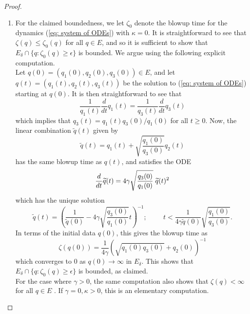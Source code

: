 \documentclass[11pt, notitlepage]{article}
\begin{document}
\begin{proof} \begin{enumerate}[label=\roman{*}).]
    \item For the claimed boundedness, we let $\zeta_0$ denote the blowup time for the dynamics (\ref{eq: system of ODEs}) with $\kappa=0$. It is straightforward to see that $\zeta(q)\le\zeta_0(q)$ for all $q\in E$, and so it is sufficient to show that $E_\delta\cap \{q: \zeta_0(q)\ge \epsilon\}$ is bounded. We argue using the following explicit computation. \medskip \\ Let $q(0)=(q_1(0),q_2(0),q_3(0))\in E$, and let $q(t)=(q_1(t),q_2(t),q_3(t))$ be the solution to (\ref{eq: system of ODEs}) starting at $q(0)$. It is then straightforward to see that \begin{equation}
        \frac{1}{q_1(t)}\frac{d}{dt}q_1(t)=\frac{1}{q_3(t)}\frac{d}{dt}q_3(t)
    \end{equation} which implies that $q_3(t)=q_1(t)q_3(0)/q_1(0)$ for all $t\ge 0$. Now, the linear combination $\widetilde{q}(t)$ given by \begin{equation}
        \widetilde{q}(t)=q_1(t)+\sqrt{\frac{q_1(0)}{q_3(0)}}q_2(t)
    \end{equation} has the same blowup time as $q(t)$, and satisfies the ODE \begin{equation} \frac{d}{dt}\widetilde{q}(t)=4\gamma\sqrt{\frac{q_3(0)}{q_1(0)}}\hspace{0.1cm}\widetilde{q}(t)^2 \end{equation} which has the unique solution \begin{equation} \widetilde{q}(t)=\left(\frac{1}{\widetilde{q}(0)}-4\gamma\sqrt{\frac{q_3(0)}{q_1(0)}}t\right)^{-1}; \hspace{1cm} t< \frac{1}{4\gamma\widetilde{q}(0)}\sqrt{\frac{q_1(0)}{q_3(0)}}. \end{equation} In terms of the initial data $q(0)$, this gives the blowup time as \begin{equation} \zeta(q(0))=\frac{1}{4\gamma}\left(\sqrt{q_1(0)q_3(0)}+q_2(0)\right)^{-1} \end{equation} which converges to $0$ as $q(0)\rightarrow \infty$ in $E_\delta.$ This shows that $E_\delta \cap \{q: \zeta_0(q)\ge \epsilon\}$ is bounded, as claimed. \medskip \\ For the case where $\gamma>0$, the same computation also shows that $\zeta(q)<\infty$ for all $q\in E$ . If $\gamma=0, \kappa>0$, this is an elementary computation.

\end{enumerate}
\end{proof}
\end{document}
